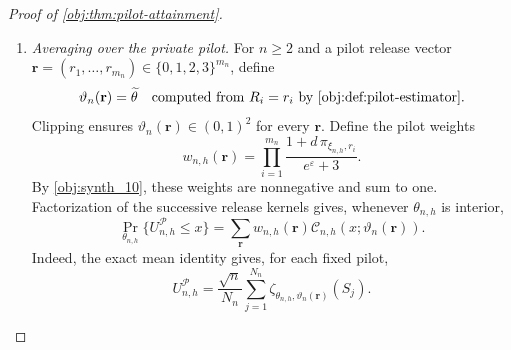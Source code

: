 \documentclass[11pt]{article}
\begin{document}
\begin{proof}[Proof of \cref{obj:thm:pilot-attainment}]
\begin{enumerate}
Take any strictly increasing sequence of integers \(n_k\ge2\) and any interior sequence \(\vartheta_k\to\theta\). Under the corresponding row law, put
\[
Z_{k,j}=\zeta_{\xi_{n_k,h},\vartheta_k}(S_j),
\qquad 1\le j\le N_{n_k},
\]
and
\[
\mathcal D_k(y)
=
\mathbb P^{\mathrm{row}}_{n_k,h,\vartheta_k}
\left\{
N_{n_k}^{-1/2}\sum_{j=1}^{N_{n_k}}Z_{k,j}\le y
\right\},
\qquad y\in\mathbb R.
\]
The rows are independent, centered, and bounded by \(2\overline\phi\), and their single-release variances satisfy
\[
\mathbb E^{\mathrm{row}}[Z_{k,1}^2]
=\sigma^2(\xi_{n_k,h},\vartheta_k)
\longrightarrow V^*(\theta,p,\varepsilon)>0.
\]
The increments normalized by
\(\sqrt{N_{n_k}V^*(\theta,p,\varepsilon)}\) therefore satisfy
\[
\sum_{j=1}^{N_{n_k}}
\mathbb E^{\mathrm{row}}
\left[
\left(\frac{Z_{k,j}}
{\sqrt{N_{n_k}V^*(\theta,p,\varepsilon)}}\right)^2
\right]
=
\frac{\sigma^2(\xi_{n_k,h},\vartheta_k)}
{V^*(\theta,p,\varepsilon)}
\longrightarrow1,
\]
and
\[
\sum_{j=1}^{N_{n_k}}
\mathbb E^{\mathrm{row}}
\left[
\left|\frac{Z_{k,j}}
{\sqrt{N_{n_k}V^*(\theta,p,\varepsilon)}}\right|^4
\right]
\le
\frac{(2\overline\phi)^4}
{N_{n_k}\{V^*(\theta,p,\varepsilon)\}^2}
\longrightarrow0.
\]
The triangular-array Lyapunov central limit theorem consequently gives
\[
\mathcal D_k(y)\longrightarrow\mathcal G_\theta(y)
\qquad(y\in\mathbb R).
\]

Define
\[
\lambda_k=\sqrt{\frac{n_k}{N_{n_k}}},
\qquad
\chi_k=\frac{x}{\lambda_k}.
\]
Then \(\lambda_k\to1\), \(\chi_k\to x\), and
\[
\mathcal C_{n_k,h}(x;\vartheta_k)=\mathcal D_k(\chi_k).
\]
For every \(a>0\), eventually
\[
\mathcal D_k(x-a)\le\mathcal D_k(\chi_k)\le\mathcal D_k(x+a).
\]
Pointwise convergence and continuity of \(\mathcal G_\theta\), followed by \(a\downarrow0\), prove
\[
\mathcal C_{n_k,h}(x;\vartheta_k)\longrightarrow\mathcal G_\theta(x).
\]

\item \emph{Averaging over the private pilot.}
For \(n\ge2\) and a pilot release vector
\(\mathbf r=(r_1,\ldots,r_{m_n})\in\{0,1,2,3\}^{m_n}\), define
\[
\vartheta_n(\mathbf r)
=\widetilde\theta
\quad\text{computed from }R_i=r_i
\text{ by }\cref{obj:def:pilot-estimator}.
\]
Clipping ensures \(\vartheta_n(\mathbf r)\in(0,1)^2\) for every \(\mathbf r\). Define the pilot weights
\[
w_{n,h}(\mathbf r)
=
\prod_{i=1}^{m_n}
\frac{1+d\,\pi_{\xi_{n,h},r_i}}{e^\varepsilon+3}.
\]
By \cref{obj:synth_10}, these weights are nonnegative and sum to one. Factorization of the successive release kernels gives, whenever \(\theta_{n,h}\) is interior,
\[
\Pr_{\theta_{n,h}}\{U_{n,h}^{\mathcal P}\le x\}
=
\sum_{\mathbf r}w_{n,h}(\mathbf r)
\mathcal C_{n,h}(x;\vartheta_n(\mathbf r)).
\]
Indeed, the exact mean identity gives, for each fixed pilot,
\[
U_{n,h}^{\mathcal P}
=
\frac{\sqrt n}{N_n}
\sum_{j=1}^{N_n}
\zeta_{\theta_{n,h},\vartheta_n(\mathbf r)}(S_j).
\]


\end{enumerate}
\end{proof}
\end{document}
